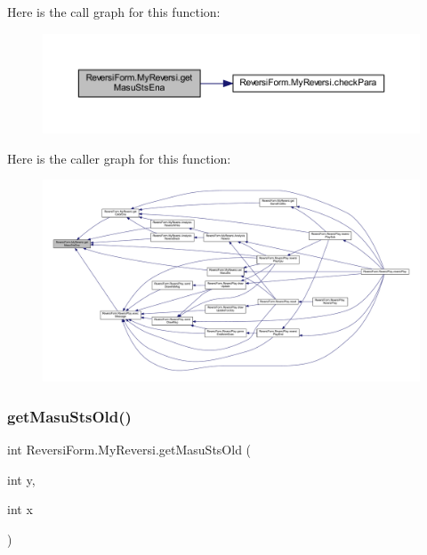 Here is the call graph for this function\+:
\nopagebreak
\begin{figure}[H]
\begin{center}
\leavevmode
\includegraphics[width=350pt]{class_reversi_form_1_1_my_reversi_ae8404068c47751d53c4b430d635a1bb2_cgraph}
\end{center}
\end{figure}
Here is the caller graph for this function\+:
\nopagebreak
\begin{figure}[H]
\begin{center}
\leavevmode
\includegraphics[width=350pt]{class_reversi_form_1_1_my_reversi_ae8404068c47751d53c4b430d635a1bb2_icgraph}
\end{center}
\end{figure}
\mbox{\label{class_reversi_form_1_1_my_reversi_abd6f4b9d6355af3175ac885731338705}} 
\subsubsection{\texorpdfstring{get\+Masu\+Sts\+Old()}{getMasuStsOld()}}
{\footnotesize\ttfamily int Reversi\+Form.\+My\+Reversi.\+get\+Masu\+Sts\+Old (\begin{DoxyParamCaption}\item[{int}]{y,  }\item[{int}]{x }\end{DoxyParamCaption})}



